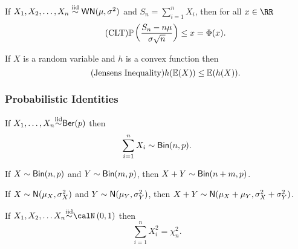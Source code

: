 \vspace{1cm}

If $X_1 , X_2 , \ldots , X_n \overset{\text{iid}}{\sim} {\sf WN} (\mu,\sigma^2)$ and $S_n = \sum_{i=1}^{n} X_i$, then for all $x \in \RR$
\begin{equation}
    \tag{CLT} {\mathbb{P}} \left( \frac{S_n - n \mu}{\sigma \sqrt{n}} \right) \leq x = \Phi (x) .
\end{equation}

\vspace{1cm}

If $X$ is a random variable and $h$ is a convex function then
\begin{equation}
    \tag{Jensens Inequality} h({\mathbb{E}} (X)) \leq {\mathbb{E}} (h(X)).
\end{equation}

\subsubsection*{Probabilistic Identities}

If $X_1 , \ldots , X_n {\overset{\text{iid}}{\sim}} {\sf Ber}(p)$ then
\begin{equation}
    \sum_{i=1}^{n} X_i \sim {\sf Bin} (n,p).
\end{equation}

\vspace{1cm}

If $X \sim {\sf Bin} (n,p)$ and $Y \sim {\sf Bin} (m,p)$, then $X + Y \sim {\sf Bin} (n+m,p)$.

\vspace{1cm}

If $X \sim {\sf N} (\mu_X,\sigma^2_X)$ and $Y \sim {\sf N} (\mu_Y,\sigma^2_Y)$, then $X + Y \sim {\sf N} (\mu_X + \mu_Y,\sigma^2_X + \sigma^2_Y)$.

\vspace{1cm}

If $X_1 , X_2 , \ldots X_n \iid \calN \left( 0 , 1 \right)$ then
\begin{equation} \label{eqn: norm_chi_sq}
    \sum_{i=1}^{n} X_i^2 = \chi_n^2 .
\end{equation}